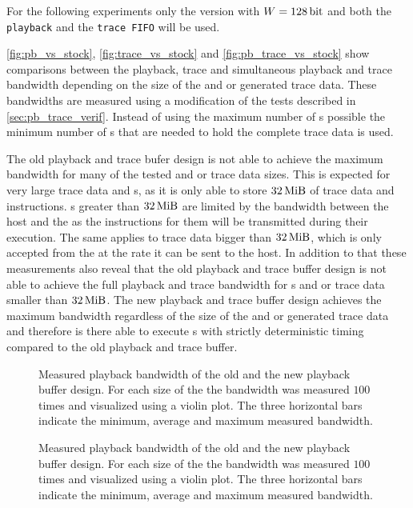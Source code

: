 For the following experiments only the version with $W = \SI{128}{\bit}$ and both the \texttt{playback} and the \texttt{trace FIFO} will be used.

\autoref{fig:pb_vs_stock}, \autoref{fig:trace_vs_stock} and \autoref{fig:pb_trace_vs_stock} show comparisons between the playback, trace and simultaneous playback and trace bandwidth depending on the size of the \PlaybackProgram{} and or generated trace data. These bandwidths are measured using a modification of the tests described in \autoref{sec:pb_trace_verif}. Instead of using the maximum number of \descriptor{}s possible the minimum number of \descriptor{}s that are needed to hold the complete \PlaybackProgram{} trace data is used.

The old playback and trace bufer design is not able to achieve the maximum bandwidth for many of the tested \PlaybackProgram{} and or trace data sizes. This is expected for very large trace data and \PlaybackProgram{}s, as it is only able to store $\SI{32}{\mebi\byte}$ of trace data and \PlaybackProgram{} instructions. \PlaybackProgram{}s greater than $\SI{32}{\mebi\byte}$ are limited by the bandwidth between the host and the \FPGA{} as the instructions for them will be transmitted during their execution. The same applies to trace data bigger than $\SI{32}{\mebi\byte}$, which is only accepted from the \pbexec{} at the rate it can be sent to the host.
In addition to that these measurements also reveal that the old playback and trace buffer design is not able to achieve the full playback and trace bandwidth for \PlaybackProgram{}s and or trace data smaller than $\SI{32}{\mebi\byte}$.
The new playback and trace buffer design achieves the maximum bandwidth regardless of the size of the \PlaybackProgram{} and or generated trace data and therefore is there able to execute \PlaybackProgram{}s with strictly deterministic timing compared to the old playback and trace buffer.
\begin{figure}[H]
\caption{Measured playback bandwidth of the old and the new playback buffer design. For each size of the \PlaybackProgram{} the bandwidth was measured $\num{100}$ times and visualized using a violin plot. The three horizontal bars indicate the minimum, average and maximum measured bandwidth.}\label{fig:pb_vs_stock}
\end{figure}

\begin{figure}[H]
\caption{Measured playback bandwidth of the old and the new playback buffer design. For each size of the \PlaybackProgram{} the bandwidth was measured $\num{100}$ times and visualized using a violin plot. The three horizontal bars indicate the minimum, average and maximum measured bandwidth.}\label{fig:trace_vs_stock}
\end{figure}

